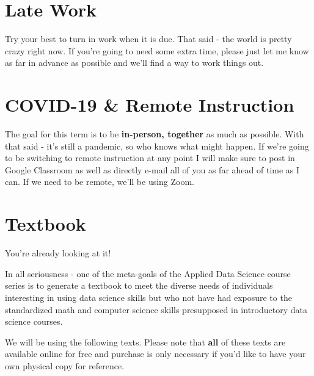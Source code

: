 \documentclass[
]{book}
\begin{document}
\hypertarget{late-work}{%
\section*{Late Work}\label{late-work}}

Try your best to turn in work when it is due. That said - the world is pretty crazy right now. If you're going to need some extra time, please just let me know as far in advance as possible and we'll find a way to work things out.

\hypertarget{covid-19-remote-instruction}{%
\section*{COVID-19 \& Remote Instruction}\label{covid-19-remote-instruction}}

The goal for this term is to be \textbf{in-person, together} as much as possible. With that said - it's still a pandemic, so who knows what might happen. If we're going to be switching to remote instruction at any point I will make sure to post in Google Classroom as well as directly e-mail all of you as far ahead of time as I can. If we need to be remote, we'll be using Zoom.

\hypertarget{textbook}{%
\section*{Textbook}\label{textbook}}

You're already looking at it!

In all seriousness - one of the meta-goals of the Applied Data Science course series is to generate a textbook to meet the diverse needs of individuals interesting in using data science skills but who not have had exposure to the standardized math and computer science skills presupposed in introductory data science courses.

We will be using the following texts. Please note that \textbf{all} of these texts are available online for free and purchase is only necessary if you'd like to have your own physical copy for reference.
\end{document}
